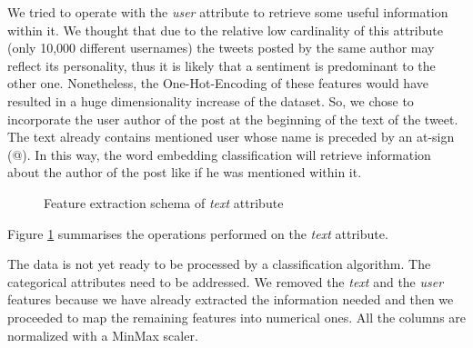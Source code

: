 \documentclass[conference]{IEEEtran}
\begin{document}
We tried to operate with the \textit{user} attribute to retrieve some useful information within it. We thought that due to the relative low cardinality of this attribute (only 10,000 different usernames) the tweets posted by the same author may reflect its personality, thus it is likely that a sentiment is predominant to the other one. Nonetheless, the One-Hot-Encoding\cite{ohe} of these features would have resulted in a huge dimensionality increase of the dataset. So, we chose to incorporate the user author of the post at the beginning of the text of the tweet. The text already contains mentioned user whose name is preceded by an at-sign (@). In this way, the word embedding classification will retrieve information about the author of the post like if he was mentioned within it.
\begin{figure}[h]
        \centering
        
        \caption{Feature extraction schema of \textit{text} attribute}
        \label{fig:text_schema}
\end{figure}

Figure \ref{fig:text_schema} summarises the operations performed on the \textit{text} attribute.

The data is not yet ready to be processed by a classification algorithm. The categorical attributes need to be addressed. We removed the \textit{text} and the \textit{user} features because we have already extracted the information needed and then we proceeded to map the remaining features into numerical ones. All the columns are normalized with a MinMax scaler\cite{minmax}.
\end{document}
